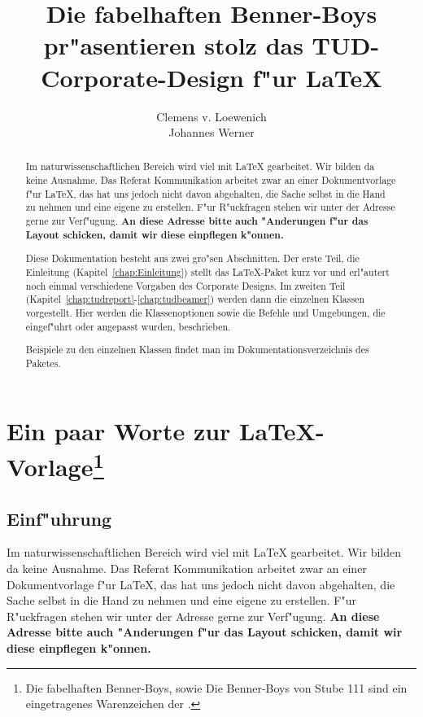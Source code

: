 \documentclass[twoside,colorback,accentcolor=tud4c,11pt]{tudreport}
\title{Die fabelhaften Benner-Boys pr"asentieren
  stolz das TUD-\\Corporate-Design f"ur {\LaTeX}}
\subtitle{Clemens v. Loewenich\\Johannes Werner}
\begin{document}
\maketitle
\begin{abstract}
   Im naturwissenschaftlichen Bereich wird viel mit {\LaTeX} gearbeitet. Wir bilden
   da keine Ausnahme. Das Referat Kommunikation arbeitet zwar an einer Dokumentvorlage f"ur
   {\LaTeX}, das hat uns jedoch nicht davon abgehalten, die Sache selbst in die Hand zu nehmen und
   eine eigene  zu erstellen.
   F"ur R"uckfragen stehen wir unter der Adresse 
   gerne zur Verf"ugung. \textbf{An diese Adresse bitte auch "Anderungen f"ur das Layout
   schicken, damit wir diese einpflegen k"onnen.}

   Diese Dokumentation besteht aus zwei gro"sen Abschnitten. Der erste Teil,
   die Einleitung (Kapitel~\ref{chap:Einleitung}) stellt das {\LaTeX}-Paket kurz vor und
   erl"autert noch einmal verschiedene Vorgaben des Corporate Designs. Im
   zweiten Teil (Kapitel~\ref{chap:tudreport}-\ref{chap:tudbeamer}) werden dann die
   einzelnen Klassen vorgestellt. Hier werden die Klassenoptionen sowie die
   Befehle und Umgebungen, die eingef"uhrt oder angepasst wurden, beschrieben.
   
   Beispiele zu den einzelnen Klassen findet man im Dokumentationsverzeichnis
   des Paketes.

\end{abstract}  

\tableofcontents

\chapter{\texorpdfstring{Ein paar Worte zur \LaTeX{}-Vorlage\footnote[1]{\glqq Die fabelhaften 
       Benner-Boys\grqq, sowie \glqq Die Benner-Boys von Stube 111\grqq{} sind ein eingetragenes
       Warenzeichen der .}}{Ein paar Worte zur
       \LaTeX{}-Vorlage}}\label{chap:Einleitung}
  
  \section{Einf"uhrung}
   Im naturwissenschaftlichen Bereich wird viel mit {\LaTeX} gearbeitet. Wir bilden 
   da keine Ausnahme. Das Referat Kommunikation arbeitet zwar an einer Dokumentvorlage f"ur
   {\LaTeX}, das hat uns jedoch nicht davon abgehalten, die Sache selbst in die Hand zu nehmen und
   eine eigene  zu erstellen.
   F"ur R"uckfragen stehen wir unter der Adresse 
   gerne zur Verf"ugung. \textbf{An diese Adresse bitte auch "Anderungen f"ur das Layout
   schicken, damit wir diese einpflegen k"onnen.}
\end{document}
